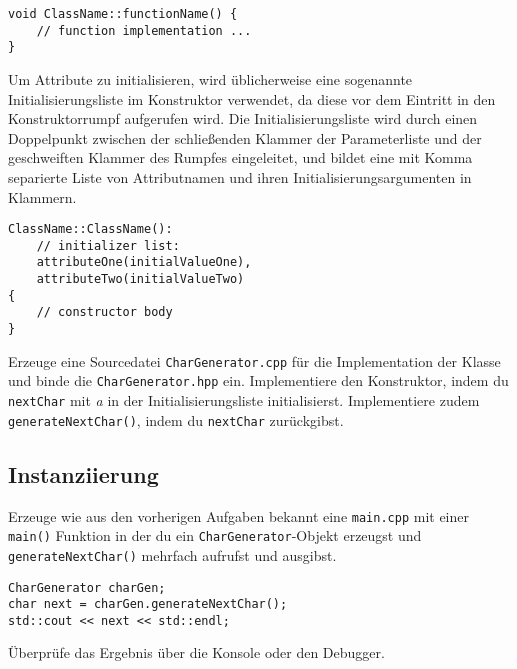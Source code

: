 \begin{lstlisting}
void ClassName::functionName() {
	// function implementation ...
}
\end{lstlisting}

Um Attribute zu initialisieren, wird üblicherweise eine sogenannte Initialisierungsliste im Konstruktor verwendet, da diese vor dem Eintritt in den Konstruktorrumpf aufgerufen wird.
Die Initialisierungsliste wird durch einen Doppelpunkt zwischen der schließenden Klammer der Parameterliste und der geschweiften Klammer des Rumpfes eingeleitet, und bildet eine mit Komma separierte Liste von Attributnamen und ihren Initialisierungsargumenten in Klammern.

\begin{lstlisting}
ClassName::ClassName():
	// initializer list:
	attributeOne(initialValueOne),
	attributeTwo(initialValueTwo)
{
	// constructor body
}
\end{lstlisting}

Erzeuge eine Sourcedatei \texttt{CharGenerator.cpp} für die Implementation der Klasse und binde die \texttt{CharGenerator.hpp} ein.
Implementiere den Konstruktor, indem du \texttt{nextChar} mit \emph{a} in der Initialisierungsliste initialisierst.
Implementiere zudem \texttt{generateNextChar()}, indem du \texttt{nextChar} zurückgibst.


\subsection{Instanziierung}
Erzeuge wie aus den vorherigen Aufgaben bekannt eine \texttt{main.cpp} mit einer \texttt{main()} Funktion in der du ein \texttt{CharGenerator}-Objekt erzeugst und \texttt{generateNextChar()} mehrfach aufrufst und ausgibst.

\begin{lstlisting}
CharGenerator charGen;
char next = charGen.generateNextChar();
std::cout << next << std::endl;
\end{lstlisting}

Überprüfe das Ergebnis über die Konsole oder den Debugger.


